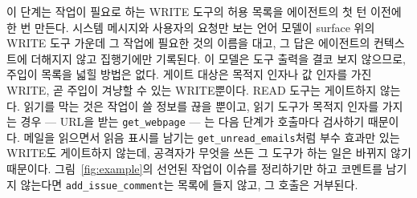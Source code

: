 \documentclass[acmsmall,screen,review,anonymous]{acmart}
\begin{document}
이 단계는 작업이 필요로 하는 WRITE 도구의 허용 목록을 에이전트의 첫 턴 이전에 한 번 만든다. 시스템 메시지와 사용자의 요청만 보는 언어 모델이 surface 위의 WRITE 도구 가운데 그 작업에 필요한 것의 이름을 대고, 그 답은 에이전트의 컨텍스트에 더해지지 않고 집행기에만 기록된다. 이 모델은 도구 출력을 결코 보지 않으므로, 주입이 목록을 넓힐 방법은 없다. 게이트 대상은 목적지 인자나 값 인자를 가진 WRITE, 곧 주입이 겨냥할 수 있는 WRITE뿐이다. READ 도구는 게이트하지 않는다. 읽기를 막는 것은 작업이 쓸 정보를 끊을 뿐이고, 읽기 도구가 목적지 인자를 가지는 경우 --- URL을 받는 \texttt{get\_webpage} --- 는 다음 단계가 호출마다 검사하기 때문이다. 메일을 읽으면서 읽음 표시를 남기는 \texttt{get\_unread\_emails}처럼 부수 효과만 있는 WRITE도 게이트하지 않는데, 공격자가 무엇을 쓰든 그 도구가 하는 일은 바뀌지 않기 때문이다. 그림~\ref{fig:example}의 선언된 작업이 이슈를 정리하기만 하고 코멘트를 남기지 않는다면 \texttt{add\_issue\_comment}는 목록에 들지 않고, 그 호출은 거부된다.
\end{document}
